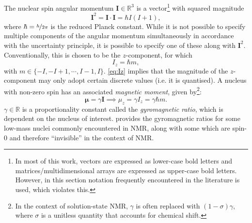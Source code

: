 The nuclear spin angular momentum $\symbf{I} \in \mathbb{R}^3$ is a
vector\footnote{
    In most of this work, vectors are expressed as lower-case
    bold letters and matrices/multidimensional arrays are expressed as
    upper-case bold letters. However, in this section notation
    frequently encountered in the literature is used, which violates this.
} with squared magnitude
\begin{equation}
  \symbf{I}^2 = \symbf{I} \cdot \symbf{I} = \hbar I (I + 1),
  \label{eq:I-squared}
\end{equation}
where $\hbar = \nicefrac{h}{2 \pi}$ is the reduced Planck constant. While it
is not possible to specify multiple components of the angular momentum
simultaneously in accordance with the uncertainty principle, it is possible to
specify one of these along with $\symbf{I}^2$. Conventionally, this is chosen
to be the $z$-component, for which
\begin{equation}
  I_z = \hbar m,
  \label{eq:Iz}
\end{equation}
with $m \in \lbrace -I, -I+1, \cdots, I - 1, I \rbrace$. \cref{eq:Iz}
implies that the magnitude of the $z$-component may only adopt certain discrete
values (i.e. it is quantised). A nucleus with non-zero spin has an associated
\textit{magnetic moment}, given by\footnote{
    In the context of solution-state \ac{NMR}, $\gamma$ is often replaced with
    $(1-\sigma)\gamma$, where $\sigma$ is a unitless quantity that accounts for
    chemical shift.
}:
\begin{equation}
  \symbf{\mu} = \gamma \symbf{I} \implies \mu_z = \gamma I_z = \gamma \hbar m.
\end{equation}
$\gamma \in \mathbb{R}$ is a proportionality constant called the
\textit{gyromagnetic ratio}, which is dependent on the nucleus of interest.
 provides the gyromagnetic ratios for some low-mass
nuclei commonly encountered in NMR, along with some which are spin-$0$ and
therefore ``invisible'' in the context of \ac{NMR}.

